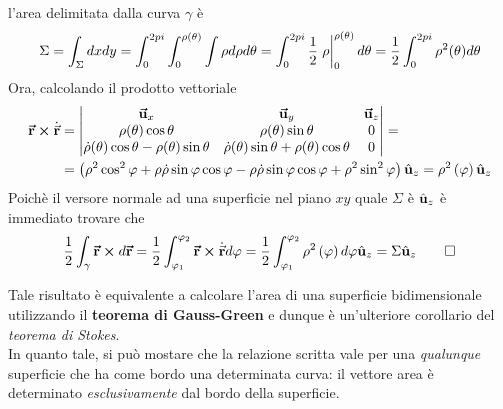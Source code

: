 \begin{demonstration}
\begin{equation*}
	\end{equation*}
	l'area delimitata dalla curva $\gamma$ è
	\begin{equation*}
		\Sigma=\int_{\Sigma}dxdy=\int_{0}^{2pi}\int_{0}^{\rho(\theta)}\int \rho d\rho d\theta= \int_{0}^{2pi}\frac{1}{2}\eval{\rho}_{0}^{\rho(\theta)} d\theta=\frac{1}{2}\int_{0}^{2pi}\rho^2(\theta)d\theta
	\end{equation*}
	Ora, calcolando il prodotto vettoriale 
	\begin{align*}
		\vb*{\va{r}}\cross\dot{\vec{\mathbf{r}}}&=
		\begin{vmatrix}
			\vb*{\va{u}}_x & \vb*{\va{u}}_y & \vb*{\va{u}}_z\\
			\rho(\theta)\cos \theta & \rho(\theta)\sin \theta & 0\\
			\dot{\rho}(\theta)\cos \theta-\rho(\theta)\sin \theta & \dot{\rho}(\theta)\sin \theta+\rho(\theta)\cos \theta & 0
		\end{vmatrix}=\\
	&=\left(\rho^2\cos^2\varphi + \rho \dot{\rho}\sin\varphi\cos\varphi-\rho \dot{\rho}\sin\varphi\cos\varphi+\rho^2\sin^2\varphi\right)\hat{\mathbf{u}}_z=\rho^2\left(\varphi\right)\hat{\mathbf{u}}_z
	\end{align*}
	Poichè il versore normale ad una superficie nel piano $xy$ quale $\Sigma$ è $\hat{\mathbf{u}}_z$ è immediato trovare che
	\begin{equation*}
		\frac{1}{2}\int_{\gamma}\vb*{\va{r}}\cross d\vb*{\va{r}}=\frac{1}{2}\int_{\varphi_1}^{\varphi_2}\vb*{\va{r}}\cross\dot{\vec{\mathbf{r}}}d\varphi=\frac{1}{2}\int_{\varphi_1}^{\varphi_2}\rho^2\left(\varphi\right)d\varphi\hat{\mathbf{u}}_z=\Sigma\hat{\mathbf{u}}_z\qedhere
	\end{equation*} 
\end{demonstration}
\begin{observe} %
	Tale risultato è equivalente a calcolare l'area di una superficie bidimensionale utilizzando il \textbf{teorema di Gauss-Green} e dunque è un'ulteriore corollario del \textit{teorema di Stokes}.\\
	In quanto tale, si può mostare che la relazione scritta vale per una \textit{qualunque} superficie che ha come bordo una determinata curva: il vettore area è determinato \textit{esclusivamente} dal bordo della superficie.
\end{observe}
